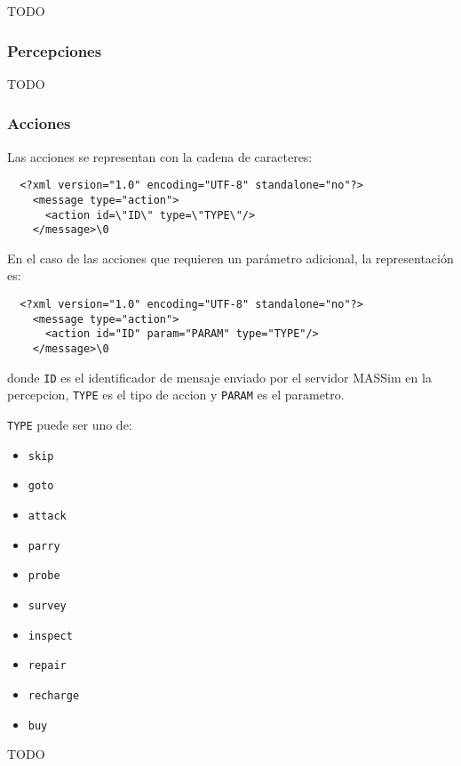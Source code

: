  TODO

\subsubsection{Percepciones}
 \label{subsub:percepciones}

 TODO

\subsubsection{Acciones}
 \label{subsub:acciones}

  Las acciones se representan con la cadena de caracteres:
  
  \begin{verbatim}
  <?xml version="1.0" encoding="UTF-8" standalone="no"?>
    <message type="action">
      <action id=\"ID\" type=\"TYPE\"/>
    </message>\0
  \end{verbatim}
  
  En el caso de las acciones que requieren un parámetro adicional, la
  representación es:
  
  \begin{verbatim}
  <?xml version="1.0" encoding="UTF-8" standalone="no"?>
    <message type="action">
      <action id="ID" param="PARAM" type="TYPE"/>
    </message>\0
  \end{verbatim}
  
  donde {\tt ID} es el identificador de mensaje enviado por el servidor
  MASSim en la percepcion, {\tt TYPE} es el tipo de accion y {\tt PARAM}
  es el parametro. 
  
  {\tt TYPE} puede ser uno de:
  
  \begin{itemize}
  \item \tt{skip}
  \item \tt{goto}
  \item \tt{attack}
  \item \tt{parry}
  \item \tt{probe}
  \item \tt{survey}
  \item \tt{inspect}
  \item \tt{repair}
  \item \tt{recharge}
  \item \tt{buy}
  \end{itemize}

 TODO

